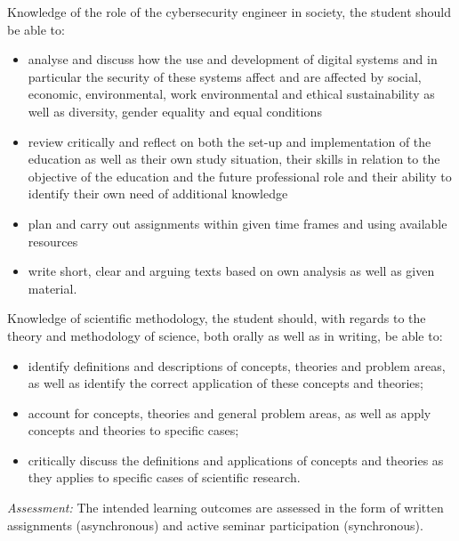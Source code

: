 Knowledge of the role of the cybersecurity engineer in society, the student 
should be able to:
\begin{itemize}
  \item analyse and discuss how the use and development of digital systems and 
    in particular the security of these systems affect and are affected by 
    social, economic, environmental, work environmental and ethical 
    sustainability as well as diversity, gender equality and equal conditions
  \item review critically and reflect on both the set-up and implementation of 
    the education as well as their own study situation, their skills in 
    relation to the objective of the education and the future professional role 
    and their ability to identify their own need of additional knowledge
  \item plan and carry out assignments within given time frames and using 
    available resources
  \item write short, clear and arguing texts based on own analysis as well as 
    given material.
\end{itemize}

Knowledge of scientific methodology, the student should, with regards to the 
theory and  methodology of science, both orally as well as in writing, be able 
to:
\begin{itemize}
  \item identify definitions and descriptions of concepts, theories and problem 
    areas, as well as identify the correct application of these concepts and 
    theories;
  \item account for concepts, theories and general problem areas, as well as 
    apply concepts and theories to specific cases;
  \item critically discuss the definitions and applications of concepts and 
    theories as they applies to specific cases of scientific research.
\end{itemize}

\emph{Assessment:}
The intended learning outcomes are assessed in the form of written assignments 
(asynchronous) and active seminar participation (synchronous).
